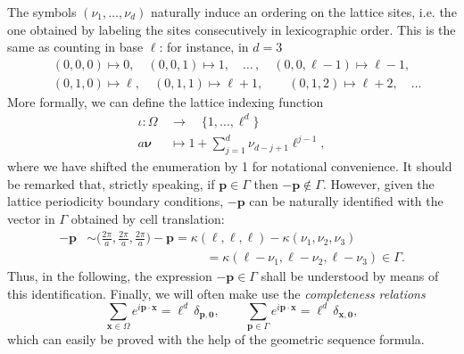 \documentclass[a4paper,10pt]{report}
\begin{document}
The symbols $(\nu_1,\dots,\nu_d)$ naturally induce an ordering on the lattice sites, i.e. the one obtained by labeling the sites consecutively in lexicographic order. This is the same as counting in base $\ell$: for instance, in $d=3$
\begin{align}
&(0,0,0)\longmapsto0, \quad (0,0,1)\longmapsto1, \quad \dots\,, \quad (0,0,\ell-1)\longmapsto \ell-1, \nonumber\\
&(0,1,0)\longmapsto \ell, \quad (0,1,1)\longmapsto \ell+1, \qquad (0,1,2)\longmapsto \ell+2, \quad \dots
\end{align}
More formally, we can define the lattice indexing function
\begin{align}
\iota: \Omega\,&\longrightarrow \quad \{1,\dots,\ell^d\} \nonumber\\
a\boldsymbol{\nu} &\longmapsto 1+\sum_{j=1}^{d} \nu_{d-j+1}\ell^{j-1},
\end{align}
where we have shifted the enumeration by 1 for notational convenience.
It should be remarked that, strictly speaking, if $\mathbf{p}\in\Gamma$ then $-\mathbf{p}\notin\Gamma$. However, given the lattice periodicity boundary conditions, $-\mathbf{p}$ can be naturally identified with the vector in $\Gamma$ obtained by cell translation:
\begin{align}
-\mathbf{p} &\sim \Big(\frac{2\pi}{a},\frac{2\pi}{a},\frac{2\pi}{a}\Big) - \mathbf{p} = \kappa(\ell,\ell,\ell) - \kappa(\nu_1,\nu_2,\nu_3) \nonumber\\
&\hspace{4cm}= \kappa(\ell-\nu_1,\ell-\nu_2,\ell-\nu_3)\in\Gamma.
\end{align}
Thus, in the following, the expression $-\mathbf{p}\in\Gamma$ shall be understood by means of this identification. Finally, we will often make use the \textit{completeness relations}
\begin{equation}
\label{eq:momentum_completeness}
\sum_{\mathbf{x}\in\Omega}e^{i\mathbf{p}\cdot\mathbf{x}} = \ell^d\,\delta_{\mathbf{p},\mathbf{0}}, \qquad 
\sum_{\mathbf{p}\in\Gamma}e^{i\mathbf{p}\cdot\mathbf{x}} = \ell^d\,\delta_{\mathbf{x},\mathbf{0}},
\end{equation}
which can easily be proved with the help of the geometric sequence formula.
\end{document}
